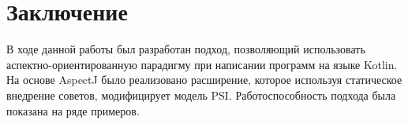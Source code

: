 \documentclass[conference]{IEEEtran}
\begin{document}



\section{Заключение}

В ходе данной работы был разработан подход, позволяющий использовать
аспектно-ориентированную парадигму при написании программ на языке Kotlin.
На основе AspectJ было реализовано расширение, которое используя статическое 
внедрение советов, модифицирует модель PSI.
Работоспособность подхода была показана на ряде примеров.
\end{document}

